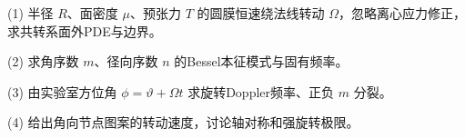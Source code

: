 (1) 半径 \(R\)、面密度 \(\mu\)、预张力 \(T\) 的圆膜恒速绕法线转动 \(\Omega\)，忽略离心应力修正，求共转系面外PDE与边界。

(2) 求角序数 \(m\)、径向序数 \(n\) 的Bessel本征模式与固有频率。

(3) 由实验室方位角 \(\phi=\vartheta+\Omega t\) 求旋转Doppler频率、正负 \(m\) 分裂。

(4) 给出角向节点图案的转动速度，讨论轴对称和强旋转极限。
